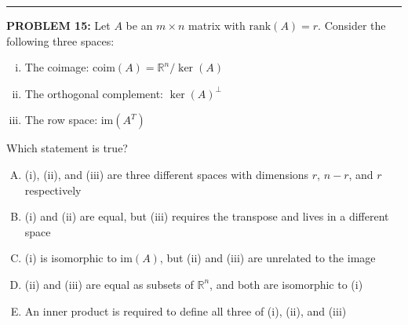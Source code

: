 \documentclass[12pt]{amsart}
\newcommand{\divider}{
  \vspace{-1em} %
  \noindent
  \raisebox{-0.15ex}{\textbullet}%
  \hspace{0.5em}%
  \rule[0.5ex]{0.95\textwidth}{1.0pt}%
  \hspace{0.5em}%
  \raisebox{-0.15ex}{\textbullet}%
  \vspace{0em} %
}
\begin{document}
{\divider


{\bf PROBLEM 15:}
% 
Let $A$ be an $m \times n$ matrix with $\text{rank}(A) = r$. 
Consider the following three spaces:
\begin{enumerate}[(i)]
\item The coimage: $\text{coim}(A) = \mathbb{R}^n / \ker(A)$
\item The orthogonal complement: $\ker(A)^{\perp}$
\item The row space: $\text{im}(A^T)$
\end{enumerate}

Which statement is true?

\begin{enumerate}[(A)]
\item (i), (ii), and (iii) are three different spaces with dimensions $r$, $n-r$, and $r$ respectively
\item (i) and (ii) are equal, but (iii) requires the transpose and lives in a different space
\item (i) is isomorphic to $\text{im}(A)$, but (ii) and (iii) are unrelated to the image
\item (ii) and (iii) are equal as subsets of $\mathbb{R}^n$, and both are isomorphic to (i)
\item An inner product is required to define all three of (i), (ii), and (iii)
\end{enumerate}


}
\end{document}
